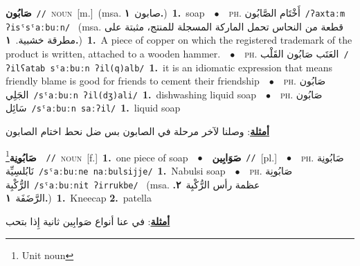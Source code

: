\documentclass[10pt,a4paper,twoside]{article} %
\begin{document}
\begin{multicols}{2}
{\setlength\topsep{0pt}\textbf{\foreignlanguage{arabic}{صَابُون}}\ {\color{gray}\texttt{//}\color{black}}\ \textsc{noun}\ [m.]\ \color{gray}(msa. \foreignlanguage{arabic}{صابون}~\foreignlanguage{arabic}{\textbf{١.}})\color{black}\ \textbf{1.}~soap\ \ $\bullet$\ \ \textsc{ph.} \color{gray} \foreignlanguage{arabic}{أَخْتَام الصَّابُون}\color{black}\ {\color{gray}\texttt{/{\sffamily ʔaxtaːm ʔisˤsˤaːbuːn}/}\color{black}}\ \color{gray} (msa. \foreignlanguage{arabic}{قطعة من النحاس تحمل الماركة المسجلة للمنتج، مثبتة على مطرقة خشبية.}~\foreignlanguage{arabic}{\textbf{١.}})\color{black}\ \textbf{1.}~A piece of copper on which the registered trademark of the product is written, attached to a wooden hammer.\ \ $\bullet$\ \ \textsc{ph.} \color{gray} \foreignlanguage{arabic}{العَتَب صَابُون القَلْب}\color{black}\ {\color{gray}\texttt{/{\sffamily ʔilʕatab sˤaːbuːn ʔil(q)alb}/}\color{black}}\ \textbf{1.}~it is an idiomatic expression that means friendly blame is good for friends to cement their friendship\ \ $\bullet$\ \ \textsc{ph.} \color{gray} \foreignlanguage{arabic}{صَابُون الجَلِي}\color{black}\ {\color{gray}\texttt{/{\sffamily sˤaːbuːn ʔil(dʒ)ali}/}\color{black}}\ \textbf{1.}~dishwashing liquid soap\ \ $\bullet$\ \ \textsc{ph.} \color{gray} \foreignlanguage{arabic}{صَابُون سَائِل}\color{black}\ {\color{gray}\texttt{/{\sffamily sˤaːbuːn saːʔil}/}\color{black}}\ \textbf{1.}~liquid soap\  \begin{flushright}\color{gray}\foreignlanguage{arabic}{\textbf{\underline{\foreignlanguage{arabic}{أمثلة}}}: وصلنا لآخر مرحلة في الصابون بس ضل نحط اختام الصابون}\end{flushright}\color{black}} \vspace{2mm}

{\setlength\topsep{0pt}\textbf{\foreignlanguage{arabic}{صَابُونِة}}\footnote{Unit noun}\ \ {\color{gray}\texttt{//}\color{black}}\ \textsc{noun}\ [f.]\ \textbf{1.}~one piece of soap\ \ $\bullet$\ \ \setlength\topsep{0pt}\textbf{\foreignlanguage{arabic}{صَوَابِين}}\ {\color{gray}\texttt{//}\color{black}}\ [pl.]\ \ $\bullet$\ \ \textsc{ph.} \color{gray} \foreignlanguage{arabic}{صَابُونِة نَابُلسِيِّة}\color{black}\ {\color{gray}\texttt{/{\sffamily sˤaːbuːne naːbulsijje}/}\color{black}}\ \textbf{1.}~Nabulsi soap\ \ $\bullet$\ \ \textsc{ph.} \color{gray} \foreignlanguage{arabic}{صَابُونِة الرُّكْبِة}\color{black}\ {\color{gray}\texttt{/{\sffamily sˤaːbuːnit ʔirrukbe}/}\color{black}}\ \color{gray} (msa. \foreignlanguage{arabic}{عظمة رأس الرُّكْبِة}~\foreignlanguage{arabic}{\textbf{٢.}}  \foreignlanguage{arabic}{الرَّضَفَة}~\foreignlanguage{arabic}{\textbf{١.}})\color{black}\ \textbf{1.}~Kneecap  \textbf{2.}~patella\  \begin{flushright}\color{gray}\foreignlanguage{arabic}{\textbf{\underline{\foreignlanguage{arabic}{أمثلة}}}: في عنا أنواع صَوابِين ثانية إِذا بتحب}\end{flushright}\color{black}} \vspace{2mm}


\end{multicols}
\end{document}
